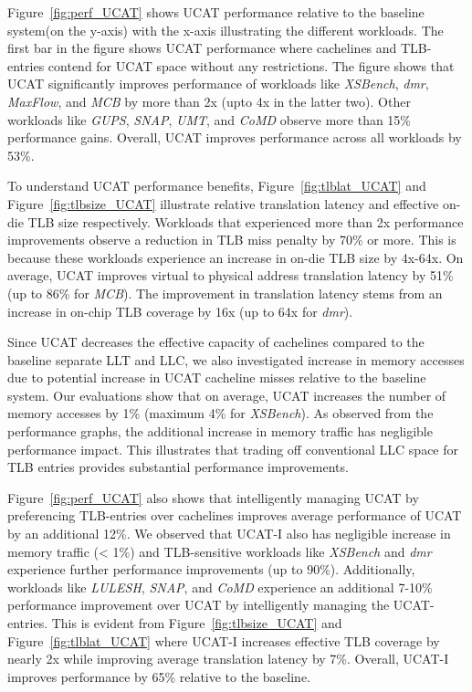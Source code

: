 
\noindent Figure~\ref{fig:perf_UCAT} shows UCAT performance relative
to the baseline system(on the y-axis) with the x-axis illustrating the
different workloads. The first bar in the figure shows UCAT
performance where cachelines and TLB-entries contend for UCAT space
without any restrictions. The figure shows that UCAT significantly
improves performance of workloads like {\em XSBench}, {\em dmr}, {\em
MaxFlow}, and {\em MCB} by more than 2x (upto 4x in the latter two).
Other workloads like {\em GUPS}, {\em SNAP}, {\em UMT}, and {\em CoMD}
observe more than 15\% performance gains. Overall, UCAT improves
performance across all workloads by 53\%.

To understand UCAT performance benefits, Figure~\ref{fig:tlblat_UCAT}
and Figure~\ref{fig:tlbsize_UCAT} illustrate relative translation
latency and effective on-die TLB size respectively. Workloads that
experienced more than 2x performance improvements observe a reduction
in TLB miss penalty by 70\% or more. This is because these workloads
experience an increase in on-die TLB size by 4x-64x. On average, UCAT
improves virtual to physical address translation latency by 51\% (up
to 86\% for {\em MCB}). The improvement in translation latency stems
from an increase in on-chip TLB coverage by 16x (up to 64x for {\em
dmr}).

Since UCAT decreases the effective capacity of cachelines compared to
the baseline separate LLT and LLC, we also investigated increase in
memory accesses due to potential increase in UCAT cacheline misses
relative to the baseline system. Our evaluations show that on average,
UCAT increases the number of memory accesses by 1\% (maximum 4\% for
{\em XSBench}). As observed from the performance graphs, the
additional increase in memory traffic has negligible performance
impact. This illustrates that trading off conventional LLC space for
TLB entries provides substantial performance improvements.

Figure~\ref{fig:perf_UCAT} also shows that intelligently managing UCAT
by preferencing TLB-entries over cachelines improves average
performance of UCAT by an additional 12\%. We observed that UCAT-I
also has negligible increase in memory traffic (< 1\%) and
TLB-sensitive workloads like {\em XSBench} and {\em dmr} experience
further performance improvements (up to 90\%). Additionally, workloads
like {\em LULESH}, {\em SNAP}, and {\em CoMD} experience an additional
7-10\% performance improvement over UCAT by intelligently managing the
UCAT-entries. This is evident from Figure~\ref{fig:tlbsize_UCAT} and
Figure~\ref{fig:tlblat_UCAT} where UCAT-I increases effective TLB
coverage by nearly 2x while improving average translation latency by
7\%. Overall, UCAT-I improves performance by 65\% relative to the baseline.


